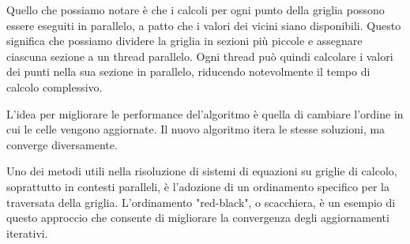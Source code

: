 \begin{figure}[H]
    \centering
\end{figure}
Quello che possiamo notare è che i calcoli per ogni punto
della griglia possono essere eseguiti in parallelo, a
patto che i valori dei vicini siano disponibili. Questo
significa che possiamo dividere la griglia in sezioni
più piccole e assegnare ciascuna sezione a un thread
parallelo. Ogni thread può quindi calcolare i valori
dei punti nella sua sezione in parallelo, riducendo
notevolmente il tempo di calcolo complessivo.

L'idea per migliorare le performance del'algoritmo
è quella di cambiare l'ordine in cui le celle vengono 
aggiornate. 
Il nuovo algoritmo itera le stesse soluzioni, ma converge 
diversamente.

Uno dei metodi utili nella risoluzione di sistemi di equazioni su griglie di calcolo, soprattutto in contesti paralleli, è l'adozione di un ordinamento specifico per la traversata della griglia. L'ordinamento "red-black", o scacchiera, è un esempio di questo approccio che consente di migliorare la convergenza degli aggiornamenti iterativi.

